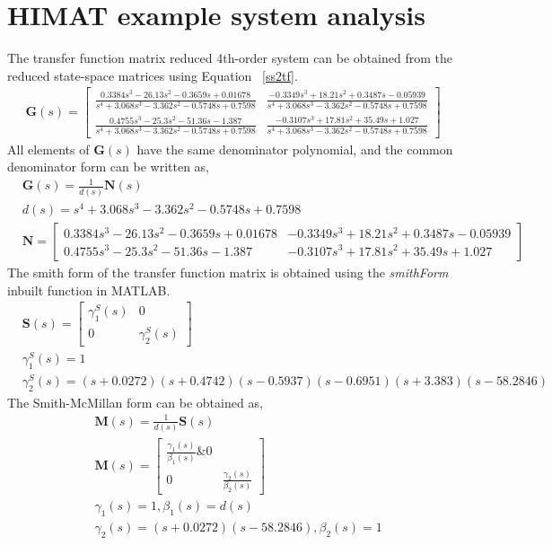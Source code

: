 \section{HIMAT example system analysis}
The transfer function matrix reduced 4th-order system can be obtained from the reduced state-space matrices using Equation ~\eqref{ss2tf}.
\begin{align*}
    \bm{G}(s) =
    \begin{bmatrix}
        \frac{0.3384 s^3 - 26.13 s^2 - 0.3659 s + 0.01678}{s^4 + 3.068 s^3 - 3.362 s^2 - 0.5748 s + 0.7598} & \frac{-0.3349 s^3 + 18.21 s^2 + 0.3487 s - 0.05939}{s^4 + 3.068 s^3 - 3.362 s^2 - 0.5748 s + 0.7598}\\
        \frac{0.4755 s^3 - 25.3 s^2 - 51.36 s - 1.387}{s^4 + 3.068 s^3 - 3.362 s^2 - 0.5748 s + 0.7598} & \frac{-0.3107 s^3 + 17.81 s^2 + 35.49 s + 1.027}{s^4 + 3.068 s^3 - 3.362 s^2 - 0.5748 s + 0.7598}   
    \end{bmatrix}
\end{align*}
All elements of $\mathbf{G}(s)$ have the same denominator polynomial, and the common denominator form can be written as,
\begin{align*}
    &\bm{G}(s) = \frac{1}{d(s)}\bm{N}(s)\\
    &d(s) = s^4 + 3.068 s^3 - 3.362 s^2 - 0.5748 s + 0.7598\\
    &\bm{N} = 
    \begin{bmatrix}
        0.3384 s^3 - 26.13 s^2 - 0.3659 s + 0.01678 & -0.3349 s^3 + 18.21 s^2 + 0.3487 s - 0.05939\\
        0.4755 s^3 - 25.3 s^2 - 51.36 s - 1.387 & -0.3107 s^3 + 17.81 s^2 + 35.49 s + 1.027   
    \end{bmatrix}
\end{align*}
The smith form of the transfer function matrix is obtained using the \emph{smithForm} inbuilt function in MATLAB.
\begin{align*}
    &\bm{S}(s) =
    \begin{bmatrix}
        \gamma^S_1(s)&0\\
        0&\gamma^S_2(s)
    \end{bmatrix}\\
    &\gamma^S_1(s) = 1\\
    &\gamma^S_2(s) = (s+0.0272)(s+0.4742)(s-0.5937)(s-0.6951)(s+3.383)(s-58.2846)
\end{align*}
The Smith-McMillan form can be obtained as,
\begin{align*}
    &\bm{M}(s) = \frac{1}{d(s)}\bm{S}(s)\\
    &\bm{M}(s) =
    \begin{bmatrix}
        \frac{\gamma_1(s)}{\beta_1(s)}\&0\\
        0&\frac{\gamma_2(s)}{\beta_2(s)}
    \end{bmatrix}\\
    &\gamma_1(s) = 1, \beta_1(s) = d(s)\\
    &\gamma_2(s) = (s+0.0272)(s-58.2846), \beta_2(s) = 1
\end{align*}
